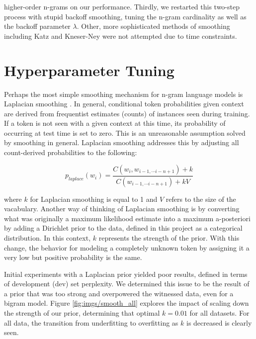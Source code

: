 \documentclass[11pt,a4paper]{article}
\begin{document}
higher-order n-grams on our performance. Thirdly, we restarted 
this two-step process with stupid backoff smoothing, tuning the n-gram cardinality as well as the
backoff parameter $\lambda$. Other, more sophisticated methods of smoothing including Katz \cite{katz1987estimation}
and Kneser-Ney \cite{kneser1995improved} were not attempted due to time constraints.

\section{Hyperparameter Tuning}%
\label{sec:hyperparam_tuning}

Perhaps the most simple smoothing mechanism for n-gram language models is Laplacian smoothing \cite{mackay1995hierarchical}.
In general, conditional token probabilities given context are derived from frequentist estimates (counts) of instances seen
during training. If a token is not seen with a given context at this time, its probability of occurring at test time is set to zero. 
This is an unreasonable assumption solved by smoothing in general. Laplacian smoothing addresses this by adjusting all count-derived
probabilities to the following:

\begin{equation}
  p_{laplace}(w_i) = \frac{C(w_i, w_{i - 1, \cdots i-n+1}) + k }{C(w_{i - 1, \cdots i-n+1}) + k V}
\end{equation}

where $k$ for Laplacian smoothing is equal to 1 and $V$ refers to the size of the vacabulary.
Another way of thinking of Laplacian smoothing is by converting what was originally
a maximum likelihood estimate into a maximum a-posteriori by adding a Dirichlet prior to the data, defined in this project as a 
categorical distribution. In this context, $k$ represents the strength of the prior. With this change, the behavior for 
modeling a completely unknown token by assigning it a very low but positive probability is the same.



Initial experiments with a Laplacian prior yielded poor results, defined in terms of development (dev) set perplexity. We 
determined this issue to be the result of a prior that was too strong and overpowered the witnessed data, even for a bigram 
model. Figure \ref{fig:imgs/smooth_all} explores the impact of scaling down the strength of our prior, determining that
optimal $k=0.01$ for all datasets. For all data, the transition from underfitting to overfitting as $k$ is decreased is clearly seen.
\end{document}
